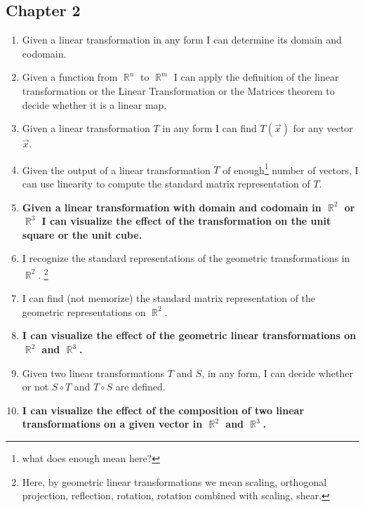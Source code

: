 \documentclass[12pt,oneside,english]{matchapter}
\numberwithin{equation}{section}
\numberwithin{figure}{section}
\DeclareMathOperator{\R}{\mathbb{R}}
\begin{document}
\subsection*{Chapter 2}
\begin{enumerate}
	\item Given a linear transformation in any form I can determine its domain and codomain. 
	\item Given a function from $\R^n$ to $\R^m$ I can apply the definition of the linear transformation or the Linear Transformation or the Matrices theorem to decide whether it is a linear map. 
	\item Given a linear transformation $T$ in any form I can find $T(\vec x)$ for any vector $\vec x$. 
	\item Given the output of a linear transformation $T$ of enough\footnote{what does enough mean here?} number of vectors, I can use linearity to compute the standard matrix representation of $T$. 
	\item \textbf{Given a linear transformation with domain and codomain in $\R^2$ or $\R^3$ I can visualize the effect of the transformation on the unit square or the unit cube.}
	
	\item I recognize the standard representations of the geometric transformations in $\R^2$. \footnote{Here, by geometric linear transformations we mean scaling, orthogonal projection, reflection, rotation, rotation combined with scaling, shear.}
	\item I can find (not memorize) the standard matrix representation of the geometric representations on $\R^2$. 
	\item \textbf{I can visualize the effect of the geometric linear transformations on $\R^2$ and $\R^3$.}
	 
	\item Given two linear transformations $T$ and $S$, in any form, I can decide whether or not $S\circ T$ and $T\circ S$ are defined. 
	
	\item \textbf{I can visualize the effect of the composition of two linear transformations on a given vector in $\R^2$ and $\R^3$. }
	

\end{enumerate}
\end{document}
